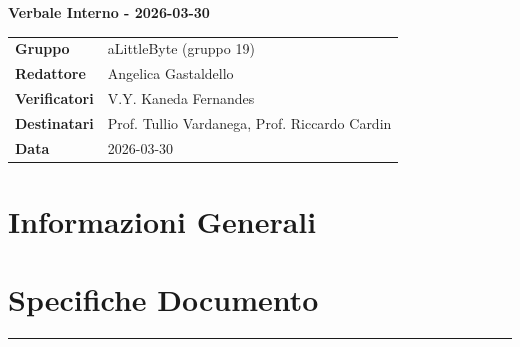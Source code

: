 \documentclass[a4paper,12pt]{article}
\begin{document}
\thispagestyle{firstpage}

\vspace*{0.5cm}

\begin{center}
    {\LARGE \textbf{Verbale Interno - 2026-03-30}}
\end{center}

\vspace{1.5cm}

\begin{center}
    \renewcommand{\arraystretch}{1.3}
    \begin{tcolorbox}[
        width=0.92\textwidth,
        colback=gray!6,
        colframe=gray!45,
        boxrule=0.5pt,
        arc=2mm,
        boxsep=0pt,
        left=8pt, right=8pt, top=8pt, bottom=8pt
    ]
        \begin{tabularx}{\linewidth}{>{\bfseries}p{3.5cm} X}
            Gruppo      & aLittleByte (gruppo 19) \\
            Redattore   & Angelica Gastaldello \\
            Verificatori & V.Y. Kaneda Fernandes\\
            Destinatari & Prof. Tullio Vardanega, Prof. Riccardo Cardin \\
            Data        & 2026-03-30\\
        \end{tabularx}
    \end{tcolorbox}
\end{center}

\newpage

\tableofcontents
\newpage
\section{Informazioni Generali}
\section*{Specifiche Documento}
\hrule
\vspace{1cm}
\end{document}
